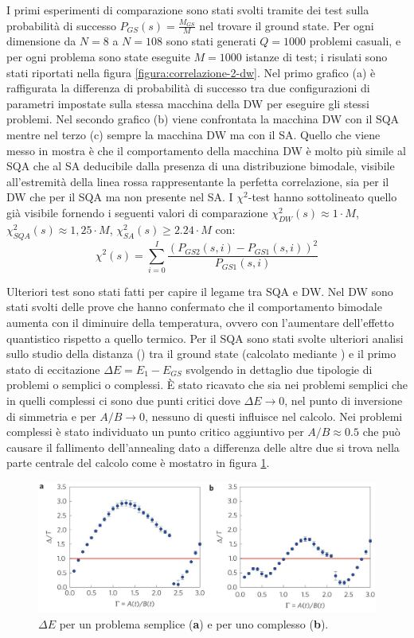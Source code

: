 I primi esperimenti di comparazione sono stati svolti tramite dei test sulla probabilità di successo $P_{GS}(s) = \frac{M_{GS}}{M}$ nel trovare il ground state. Per ogni dimensione da $N=8$ a $N=108$ sono stati generati $Q=1000$ problemi casuali, e per ogni problema sono state eseguite $M=1000$ istanze di test; i risulati sono stati riportati nella figura \ref{figura:correlazione-2-dw}.
Nel primo grafico (a) è raffigurata la differenza di probabilità di successo tra due configurazioni di parametri impostate sulla stessa macchina della DW per eseguire gli stessi problemi. Nel secondo grafico (b) viene confrontata la macchina DW con il SQA mentre nel terzo (c) sempre la macchina DW ma con il SA. Quello che viene messo in mostra è che il comportamento della macchina DW è molto più simile al SQA che al SA deducibile dalla presenza di una distribuzione bimodale, visibile all'estremità della linea rossa rappresentante la perfetta correlazione, sia per il DW che per il SQA ma non presente nel SA.
I $\chi^2$-test hanno sottolineato quello già visibile fornendo i seguenti valori di comparazione $\chi_{DW}^2(s) \approx 1 \cdot M$, $\chi_{SQA}^2(s) \approx 1,25 \cdot M$, $\chi_{SA}^2(s) \geq 2.24 \cdot M$ con:
$$\chi^2(s) = \sum_{i=0}^I \frac{(P_{GS2}(s, i) -P_{GS1}(s, i))^2}{P_{GS1}(s, i)}$$

Ulteriori test sono stati fatti per capire il legame tra SQA e DW. Nel DW sono stati svolti delle prove che hanno confermato che il comportamento bimodale aumenta con il diminuire della temperatura, ovvero con l'aumentare dell'effetto quantistico rispetto a quello termico. Per il SQA sono stati svolte ulteriori analisi sullo studio della distanza () tra il ground state (calcolato mediante \cite{SRVR}) e il primo stato di eccitazione $\Delta E = E_{1} - E_{GS}$ svolgendo in dettaglio due tipologie di problemi o semplici o complessi. È stato ricavato che sia nei problemi semplici che in quelli complessi ci sono due punti critici dove $\Delta E \to 0$, nel punto di inversione di simmetria e per $A/B \to 0$, nessuno di questi influisce nel calcolo. Nei problemi complessi è stato individuato un punto critico aggiuntivo per $A/B \approx 0.5$ che può causare il fallimento dell'annealing dato a differenza delle altre due si trova nella parte centrale del calcolo come è mostatro in figura \ref{figura:ground-state-gap}.

\begin{figure}[htbp]
  \centering
  \includegraphics[scale=0.38]{Immagini/ground-state-gap.jpg}
  \caption{$\Delta E$ per un problema semplice (\textbf{a}) e per uno complesso (\textbf{b}).}
  \label{figura:ground-state-gap}
\end{figure}


